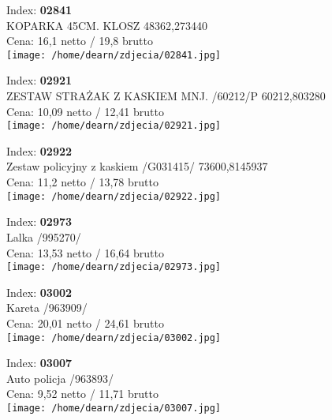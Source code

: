 {Index: \textbf{02841}\\
KOPARKA 45CM.  KLOSZ 48362,273440\\
Cena: 16,1 netto / 19,8 brutto\\
  \texttt{[image: /home/dearn/zdjecia/02841.jpg]}}\newline\newline

{Index: \textbf{02921}\\
ZESTAW STRAŻAK Z KASKIEM MNJ. /60212/P    60212,803280\\
Cena: 10,09 netto / 12,41 brutto\\
  \texttt{[image: /home/dearn/zdjecia/02921.jpg]}}\newline\newline

{Index: \textbf{02922}\\
Zestaw policyjny z kaskiem /G031415/      73600,8145937\\
Cena: 11,2 netto / 13,78 brutto\\
  \texttt{[image: /home/dearn/zdjecia/02922.jpg]}}\newline\newline

{Index: \textbf{02973}\\
Lalka /995270/\\
Cena: 13,53 netto / 16,64 brutto\\
  \texttt{[image: /home/dearn/zdjecia/02973.jpg]}}\newline\newline

{Index: \textbf{03002}\\
Kareta /963909/\\
Cena: 20,01 netto / 24,61 brutto\\
  \texttt{[image: /home/dearn/zdjecia/03002.jpg]}}\newline\newline

{Index: \textbf{03007}\\
Auto policja /963893/\\
Cena: 9,52 netto / 11,71 brutto\\
  \texttt{[image: /home/dearn/zdjecia/03007.jpg]}}\newline\newline

